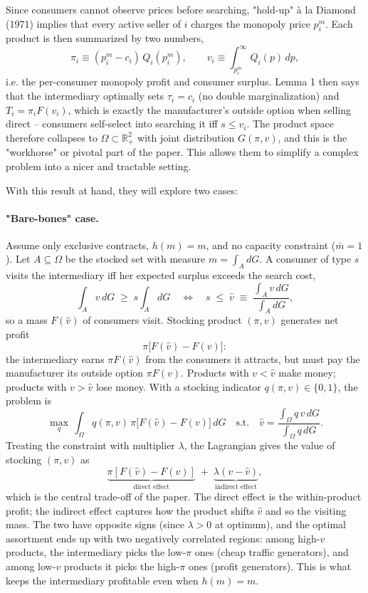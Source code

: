 \documentclass[11pt]{article}
\begin{document}
Since consumers cannot observe prices before searching, "hold-up" à la Diamond (1971) implies that every active seller of $i$ charges the monopoly price $p_i^m$. Each product is then summarized by two numbers,
\[
\pi_i \equiv (p_i^m - c_i)\, Q_i(p_i^m), \qquad v_i \equiv \int_{p_i^m}^{\infty} Q_i(p)\, dp,
\]
i.e. the per-consumer monopoly profit and consumer surplus. Lemma 1 then says that the intermediary optimally sets $\tau_i=c_i$ (no double marginalization) and $T_i = \pi_i F(v_i)$, which is exactly the manufacturer's outside option when selling direct -- consumers self-select into searching it iff $s\leq v_i$. The product space therefore collapses to $\Omega\subset\mathbb{R}_+^2$ with joint distribution $G(\pi,v)$, and this is the "workhorse" or pivotal part of the paper. This allows them to simplify a complex problem into a nicer and tractable setting. 

With this result at hand, they will explore two cases:

\paragraph{"Bare-bones" case.} Assume only exclusive contracts, $h(m)=m$, and no capacity constraint ($\bar{m}=1$). Let $A \subseteq \Omega$ be the stocked set with measure $m = \int_A dG$. A consumer of type $s$ visits the intermediary iff her expected surplus exceeds the search cost,
\[
\int_A v\, dG \;\geq\; s \int_A dG \quad\Longleftrightarrow\quad s \;\leq\; \hat{v} \;\equiv\; \frac{\int_A v\, dG}{\int_A dG},
\]
so a mass $F(\hat{v})$ of consumers visit. Stocking product $(\pi,v)$ generates net profit
\[
\pi\bigl[F(\hat{v}) - F(v)\bigr]:
\]
the intermediary earns $\pi F(\hat{v})$ from the consumers it attracts, but must pay the manufacturer its outside option $\pi F(v)$. Products with $v < \hat{v}$ make money; products with $v > \hat{v}$ lose money. With a stocking indicator $q(\pi,v)\in\{0,1\}$, the problem is
\[
\max_{q}\, \int_\Omega q(\pi,v)\,\pi\bigl[F(\hat{v})-F(v)\bigr]\, dG \quad \text{s.t.}\quad \hat{v}=\frac{\int_\Omega q\, v\, dG}{\int_\Omega q\, dG}.
\]
Treating the constraint with multiplier $\lambda$, the Lagrangian gives the value of stocking $(\pi,v)$ as
\[
\underbrace{\pi[F(\hat{v})-F(v)]}_{\text{direct effect}} \;+\; \underbrace{\lambda(v-\hat{v})}_{\text{indirect effect}},
\]
which is the central trade-off of the paper. The direct effect is the within-product profit; the indirect effect captures how the product shifts $\hat{v}$ and so the visiting mass. The two have opposite signs (since $\lambda>0$ at optimum), and the optimal assortment ends up with two negatively correlated regions: among high-$v$ products, the intermediary picks the low-$\pi$ ones (cheap traffic generators), and among low-$v$ products it picks the high-$\pi$ ones (profit generators). This is what keeps the intermediary profitable even when $h(m)=m$.
\end{document}
